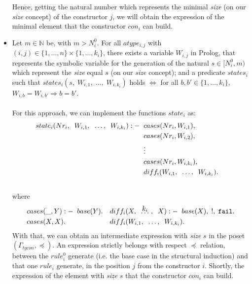 \begin{itemize}
	      Hence, getting the natural number which represents the minimal \textit{size} (on our \textit{size} concept) of the constructor $j$, we will obtain the expression of the minimal element that the constructor $con_i$ can build.
	\item Let $m \in \mathbb{N}$ be, with $m > N_{i}^{0}$. For all $atype_{i,j}$ with $(i,j) \in \{1, \ldots, n \} \times \{1, \ldots, k_i \}$, there exists a variable $W_{i,j}$ in Prolog, that represents the symbolic variable for the generation of the natural $s \in [N_{i}^{0}, m )$ which represent the \textit{size} equal $s$ (on our \textit{size} concept); and a predicate $states_{i}$ such that $states_i(s, \; W_{i,1}, \; \ldots, \; W_{i,k_i})$ holds $\Longleftrightarrow $ for all $b,b' \in \{1, \ldots, k_i \}$,  $W_{i,b}=W_{i,b'} \Rightarrow b = b'$.\\\\
		      For this approach, we can implement the functions $state_i$ as:
		      \begin{align*}
		      	state_i(Nr_i, \;\; W_{i,1}, \;\; \ldots, \;\; W_{i, k_i}) :-
		      	  & \;\; cases(Nr_i, W_{i,1}),                          &   &   \\
		      	  & \;\; cases(Nr_i, W_{i,2}),                          &   &   \\
		      	  & \;\; \vdots                                         &   &   \\
		      	  & \;\; cases(Nr_i, W_{i,k_i}),                        &   &   \\
		      	  & \;\; diff_i(W_{i,1}, \;\; \ldots, \;\; W_{i, k_i}). &   &   \\\\
		      \end{align*}
		      where
		      \begin{align*}
		      	  & cases(\_, Y) :- \tav base(Y). &   & diff_i(X, \tav \kldots{$k_i$}\;, \tav X) :- \tav base(X), \; !, \; \ttt{fail}. \\
		      	  & cases(X, X).                  &   & diff_i(W_{i,1}, \tav \ldots, \tav W_{i, k_i}).                                 
		      \end{align*}
		      With that, we can obtain an intermediate expression with \textit{size} $s$ in the poset $(\Gamma_{tycon}, \preceq)$. An expression strictly belongs with respect $\preceq$ relation, between the $rule_{i}^{0}$ generate (i.e. the base case in the structural induction) and that one $rule_i$ generate, in the position $j$ from the constructor $i$. Shortly, the expression of the element with \textit{size} $s$ that the constructor $con_i$ can build.
	\end{itemize}
